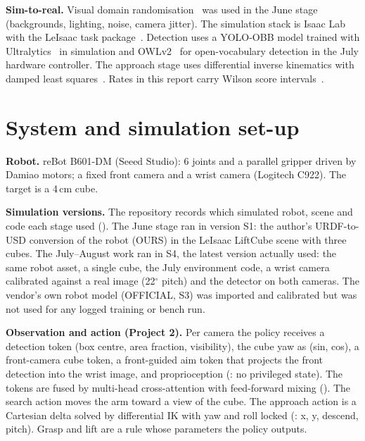 \documentclass[conference,10pt]{IEEEtran}
\begin{document}
\textbf{Sim-to-real.} Visual domain randomisation~\cite{tobin2017dr} was used in the June stage (backgrounds, lighting,
noise, camera jitter). The simulation stack is Isaac Lab~\cite{mittal2023orbit} with the LeIsaac task
package~\cite{leisaac}. Detection uses a YOLO-OBB model trained with Ultralytics~\cite{ultralytics} in simulation and
OWLv2~\cite{minderer2023owlv2} for open-vocabulary detection in the July hardware controller. The approach stage uses
differential inverse kinematics with damped least squares~\cite{buss2004ik}. Rates in this report carry Wilson score
intervals~\cite{wilson1927}.

\section{System and simulation set-up}\label{sec:setup}
\textbf{Robot.} reBot B601-DM (Seeed Studio): 6 joints and a parallel gripper driven by Damiao motors; a fixed front
camera and a wrist camera (Logitech C922). The target is a 4\,cm cube.

\textbf{Simulation versions.} The repository records which simulated robot, scene and code each stage used
(). The June stage ran in version S1: the author's URDF-to-USD conversion of the
robot (OURS) in the LeIsaac LiftCube scene with three cubes. The July--August work ran in S4, the latest version
actually used: the same robot asset, a single cube, the July environment code, a wrist camera calibrated against a real
image (22$^\circ$ pitch) and the detector on both cameras. The vendor's own robot model (OFFICIAL, S3) was imported and
calibrated but was not used for any logged training or
bench run.

\textbf{Observation and action (Project 2).} Per camera the policy receives a detection token (box centre, area
fraction, visibility), the cube yaw as (sin, cos), a front-camera cube token, a front-guided aim token that projects the
front detection into the wrist image, and proprioception (: no privileged state). The tokens are
fused by multi-head cross-attention with feed-forward mixing (). The search action
moves the arm toward a view of the cube. The approach action is a Cartesian delta solved by differential IK with yaw and
roll locked (: x, y, descend, pitch). Grasp and lift are a rule whose parameters the policy outputs.
\end{document}
